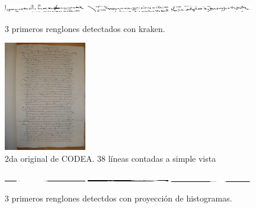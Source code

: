 \documentclass[11pt,a4paper]{article}
\begin{document}
\begin{figure}[H] 
\centering 
\begin{minipage}{1.0\textwidth} 
\includegraphics[width=0.32\textwidth]{1_CODEA_1_kraken.png} 
\includegraphics[width=0.32\textwidth]{1_CODEA_2_kraken.png} 
\includegraphics[width=0.32\textwidth]{1_CODEA_3_kraken.png} 
\caption{3 primeros renglones detectados con kraken.} 
\label{fig:3 líneas kraken 1ra CODEA} 
\end{minipage} 
\end{figure}

\begin{figure}[H] 
\centering 
\begin{minipage}{1.0\textwidth} 
\includegraphics[width=0.32\textwidth]{CODEA-0206_1r.jpg} 
\caption{2da original de CODEA. 38 líneas contadas a simple vista} 
\label{fig:2da CODEA} 
\end{minipage} 
\end{figure}

\begin{figure}[H] 
\centering 
\begin{minipage}{1.0\textwidth} 
\includegraphics[width=0.32\textwidth]{2_CODEA_1_PH.png} 
\includegraphics[width=0.32\textwidth]{2_CODEA_2_PH.png} 
\includegraphics[width=0.32\textwidth]{2_CODEA_3_PH.png} 
\caption{3 primeros renglones detectdos con proyección de histogramas.} 
\label{fig:3 líneas PH 2da CODEA} 
\end{minipage} 
\end{figure}
\end{document}
